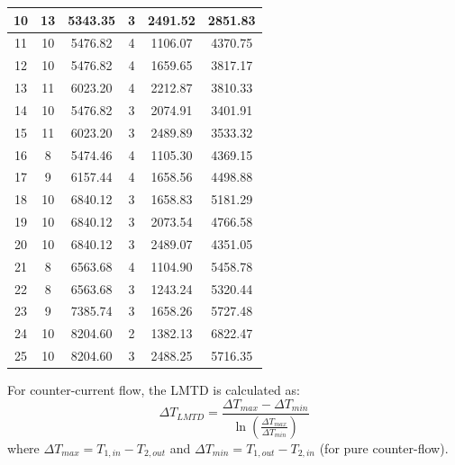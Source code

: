 {\begin{longtable}{|c|c|c|c|c|c|}
    10           & 13                                & 5343.35 & 3 & 2491.52 & 2851.83     \\ \hline
    11           & 10                                & 5476.82 & 4 & 1106.07 & 4370.75     \\
    12           & 10                                & 5476.82 & 4 & 1659.65 & 3817.17     \\
    13           & 11                                & 6023.20 & 4 & 2212.87 & 3810.33     \\
    14           & 10                                & 5476.82 & 3 & 2074.91 & 3401.91     \\
    15           & 11                                & 6023.20 & 3 & 2489.89 & 3533.32     \\ \hline
    16           & 8                                 & 5474.46 & 4 & 1105.30 & 4369.15     \\
    17           & 9                                 & 6157.44 & 4 & 1658.56 & 4498.88     \\
    18           & 10                                & 6840.12 & 3 & 1658.83 & 5181.29     \\
    19           & 10                                & 6840.12 & 3 & 2073.54 & 4766.58     \\
    20           & 10                                & 6840.12 & 3 & 2489.07 & 4351.05     \\ \hline
    21           & 8                                 & 6563.68 & 4 & 1104.90 & 5458.78     \\
    22           & 8                                 & 6563.68 & 3 & 1243.24 & 5320.44     \\
    23           & 9                                 & 7385.74 & 3 & 1658.26 & 5727.48     \\
    24           & 10                                & 8204.60 & 2 & 1382.13 & 6822.47     \\
    25           & 10                                & 8204.60 & 3 & 2488.25 & 5716.35     \\ \hline
\end{longtable}
}

For counter-current flow, the LMTD is calculated as:
\begin{equation}
    \Delta T_{LMTD} = \frac{\Delta T_{max} - \Delta T_{min}}{\ln(\frac{\Delta T_{max}}{\Delta T_{min}})}
\end{equation}
where $\Delta T_{max} = T_{1,in} - T_{2,out}$ and $\Delta T_{min} = T_{1,out} - T_{2,in}$ (for pure counter-flow).

